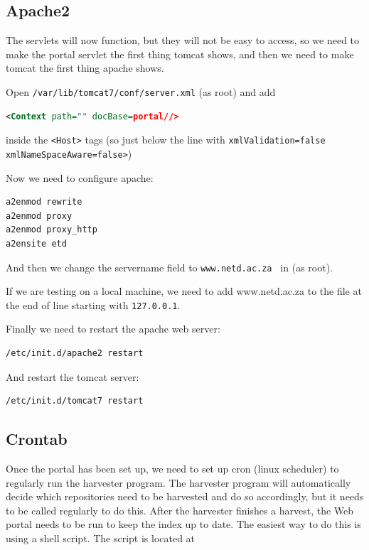 \documentclass[a4paper,11pt]{article}
\begin{document}
\subsection{Apache2}
\label{sec:installation_process:apache2}

The servlets will now function, but they will not be easy to access, so we need to make the portal servlet the first thing tomcat shows, and then we need to make tomcat the first thing apache shows.

Open \texttt{/var/lib/tomcat7/conf/server.xml} (as root) and add 

\begin{lstlisting}[language=XML]
<Context path="" docBase=portal//> 
\end{lstlisting}

inside the \texttt{<Host>} tags (so just below the line with \texttt{xmlValidation=false xmlNameSpaceAware=false>})

Now we need to configure apache: 

\begin{lstlisting}[language=bash]
a2enmod rewrite 
a2enmod proxy 
a2enmod proxy_http 
a2ensite etd
\end{lstlisting}

And then we change the servername field to \texttt{www.netd.ac.za } in  (as root).

If we are testing on a local machine, we need to add www.netd.ac.za to the  file at the end of line starting with \texttt{127.0.0.1}.

Finally we need to restart the apache web server: 

\begin{lstlisting}[language=bash]
/etc/init.d/apache2 restart
\end{lstlisting}

And restart the tomcat server: 

\begin{lstlisting}[language=bash]
/etc/init.d/tomcat7 restart
\end{lstlisting}

\subsection{Crontab}
\label{sec:installation_process:crontab}

Once the portal has been set up, we need to set up cron (linux scheduler) to regularly run the harvester program. The harvester program will automatically decide which repositories need to be harvested and do so accordingly, but it needs to be called regularly to do this. After the harvester finishes a harvest, the Web portal needs to be run to keep the index up to date. The easiest way to do this is using a shell script. The script is located at 
\end{document}
